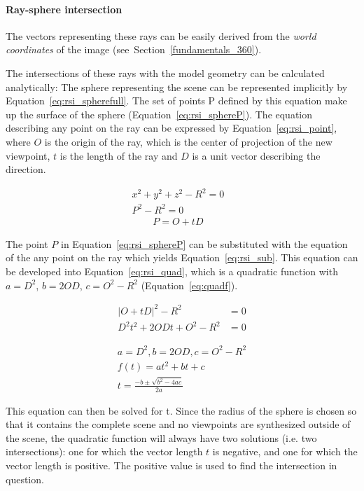\paragraph{Ray-sphere intersection}
The vectors representing these rays can be easily derived from the \emph{world coordinates} of the image (see~Section~\ref{fundamentals_360}).

The intersections of these rays with the model geometry can be calculated analytically: The sphere representing the scene can be represented implicitly by Equation~\ref{eq:rsi_spherefull}. The set of points P defined by this equation make up the surface of the sphere (Equation~\ref{eq:rsi_sphereP}). 
The equation describing any point on the ray can be expressed by Equation~\ref{eq:rsi_point}, where $O$ is the origin of the ray, which is the center of projection of the new viewpoint, $t$ is the length of the ray and $D$ is a unit vector describing the direction. 

\begin{align}
  x^2 + y^2 + z^2 - R^2 = 0&\label{eq:rsi_spherefull}\\ 
  P^2 - R^2 = 0&\label{eq:rsi_sphereP}
\end{align} 
\begin{align}
  P = O + tD& \label{eq:rsi_point}
\end{align} 

The point $P$ in Equation~\ref{eq:rsi_sphereP} can be substituted with the equation of the any point on the ray which yields Equation~\ref{eq:rsi_sub}. This equation can be developed into Equation~\ref{eq:rsi_quad}, which is a quadratic function with $a = D^2$, $b = 2OD$, $c = O^2-R^2$ (Equation~\ref{eq:quadf}).

\begin{align}
  |O + tD|^2 - R^2 &= 0  \label{eq:rsi_sub}\\
  D^2 t^2 + 2ODt + O^2 - R^2 &= 0 \label{eq:rsi_quad}
\end{align}

\begin{align}
  a = D^2, b = 2OD, c = O^2-R^2 \\
  f(t) = at^2 + bt + c \label{eq:quadf}\\
  t = \frac{-b \pm \sqrt{b^2 - 4ac}}{2a} \label{eq:solvequadf}
\end{align}

This equation can then be solved for t. Since the radius of the sphere is chosen so that it contains the complete scene and no viewpoints are synthesized outside of the scene, the quadratic function will always have two solutions (i.e. two intersections): one for which the vector length $t$ is negative, and one for which the vector length is positive. The positive value is used to find the intersection in question.


